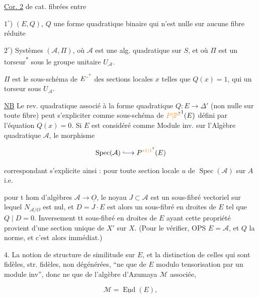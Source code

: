 \uline{Cor. 2}  de cat. fibrées entre

$1^\circ$) $(E,Q)$, $Q$ une forme quadratique binaire qui n'est nulle sur aucune fibre réduite

$2^\circ$) Systèmes $(\mathcal A,\Pi)$, où $\mathcal A$ est une alg. quadratique sur $S$, et où $\Pi$ est un torseur\textsuperscript{*} sous le groupe unitaire $U_{\mathcal A}$. \deleted{\unsure{*}}


$\Pi$ est le sous-schéma de $E^{\unsure{*}}$ des sections locales $x$ telles que $Q(x)=1$, qui  un torseur sous $U_{\mathcal A}$.

\uline{NB} Le rev. quadratique associé à la forme quadratique $Q:E\longrightarrow\Delta'$ (non nulle sur toute fibre) peut s'expliciter comme  sous-schéma de ${\unsure{P|\mathbb P}}^1(E)$ défini par l'équation $Q(x)=0$. Si $E$ est considéré comme Module inv. sur l'Algèbre quadratique $\mathcal A$, le morphisme

\[
\operatorname{Spec}(\mathcal A)\lhook\joinrel\longrightarrow{P}^{\unsure{*1|1}}(E)
\]

correspondant  s'explicite ainsi : pour toute section locale $u$ de $\operatorname{Spec}(\mathcal A)$ sur $A$ i.e.

pour t hom d'algèbres $\mathcal A\longrightarrow\underline O$, le noyau $J\subset\mathcal A$ est un sous-fibré vectoriel  sur lequel $N_{\mathcal A/O}$ est nul,  et $D=J\cdot E$ est alors un sous-fibré en droites de $E$ tel que $Q\mid D=0$. Inversement tt sous-fibré en droites de $E$ ayant cette propriété provient d'une section unique de $X'$ sur $X$. (Pour le vérifier, OPS $E=\mathcal A$, et $Q$ la norme, et c'est alors immédiat.)

4. La notion de structure de similitude sur $E$, et la distinction de celles qui sont fidèles, str. fidèles,  non dégénérées, ``ne  que de $E$ modulo tensorisation par un module inv'', donc ne  que de l'algèbre d'Azumaya $\mathcal M$ associée,

\[
\mathcal M=\underline{\operatorname{End}}(E),
\]

